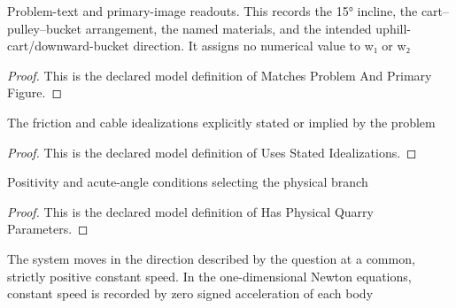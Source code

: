 \begin{definition}
  \label{def:physics:phyx-mini-0800:phyxminiproblems-problemphyxmini0800-matchesproblemandprimaryfigure}
  Problem-text and primary-image readouts. This records the 15° incline, the cart--pulley--bucket arrangement, the named materials, and the intended uphill-cart/downward-bucket direction. It assigns no numerical value to w₁ or w₂
\end{definition}
\begin{proof}
  This is the declared model definition of Matches Problem And Primary Figure.
\end{proof}
\begin{definition}
  \label{def:physics:phyx-mini-0800:phyxminiproblems-problemphyxmini0800-usesstatedidealizations}
  The friction and cable idealizations explicitly stated or implied by the problem
\end{definition}
\begin{proof}
  This is the declared model definition of Uses Stated Idealizations.
\end{proof}
\begin{definition}
  \label{def:physics:phyx-mini-0800:phyxminiproblems-problemphyxmini0800-hasphysicalquarryparameters}
  Positivity and acute-angle conditions selecting the physical branch
\end{definition}
\begin{proof}
  This is the declared model definition of Has Physical Quarry Parameters.
\end{proof}
\begin{definition}
  \label{def:physics:phyx-mini-0800:phyxminiproblems-problemphyxmini0800-moveswithconstantspeed}
  The system moves in the direction described by the question at a common, strictly positive constant speed. In the one-dimensional Newton equations, constant speed is recorded by zero signed acceleration of each body
\end{definition}
